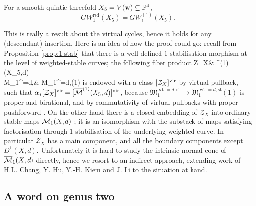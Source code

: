 \begin{thm}\cite{BCM}\label{thm:redvscusp}
 For a smooth quintic threefold $X_5=V(\mathbf w)\subseteq \mathbb P^4$, \[GW_1^{\mathrm{red}}(X_5)=GW_1^{(1)}(X_5).\]
\end{thm}
This is really a result about the virtual cycles, hence it holds for any (descendant) insertion. Here is an idea of how the proof could go: recall from Proposition \ref{prop:1-stab} that there is a well-defined $1$-stabilisation morphism at the level of weighted-stable curves; the following fiber product
\bcd
\mathcal Z_X\ar[r,"\alpha"]\ar[d] & \oM^{(1)}(X_5,d)\ar[d] \\
\mathfrak M_{1}^{=d,}\ar[r] & \mathfrak M_{1}^{=d,}(1)
\ecd
is endowed with a class $[\mathcal Z_X]^{\mathrm{vir}}$ by virtual pullback, such that $\alpha_*[\mathcal Z_X]^{\mathrm{vir}}=[\overline{\mathcal{M}}^{(1)}(X_5,d)]^{\mathrm{vir}}$, because $\mathfrak M_{1}^{\operatorname{wt}=d,\text{st}}\to \mathfrak M_{1}^{\operatorname{wt}=d,\text{st}}(1)$ is proper \cite[Lemma 4.19]{BCM} and birational, and by commutativity of virtual pullbacks with proper pushforward \cite{Manolache-Pull}. On the other hand there is a closed embedding of $\mathcal Z_X$ into ordinary stable maps $\overline{\mathcal{M}}_1(X,d)$ \cite[Lemma 4.13]{BCM}; it is an isomorphism with the substack of maps satisfying factorisation through $1$-stabilisation of the underlying weighted curve. In particular $\mathcal Z_X$ has a main component, and all the boundary components except $D^1(X,d)$. Unfortunately it is hard to study the intrinsic normal cone of $\overline{\mathcal{M}}_1(X,d)$ directly, hence we resort to an indirect approach, extending work of H.L. Chang, Y. Hu, Y.-H. Kiem and J. Li to the situation at hand.

\subsection{A word on genus two}

